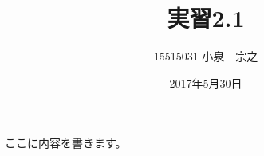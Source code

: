 \documentclass[12pt,a4j]{jarticle}
\title{実習2.1}
\author{15515031 小泉　宗之}
\date{2017年5月30日}
\begin{document}
\maketitle
ここに内容を書きます。
\end{document}
